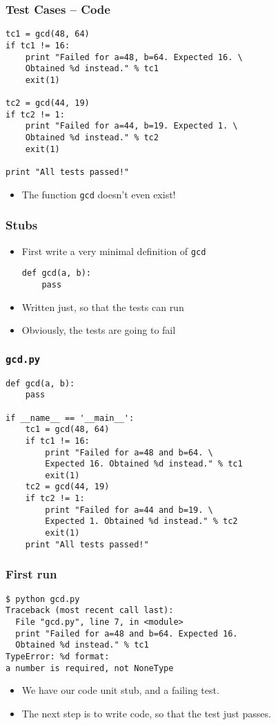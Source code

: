 \documentclass[12pt,presentation]{beamer}
\begin{document}
\begin{frame}[fragile]
  \frametitle{Test Cases -- Code}
\begin{lstlisting}
tc1 = gcd(48, 64)
if tc1 != 16:
    print "Failed for a=48, b=64. Expected 16. \
    Obtained %d instead." % tc1
    exit(1)

tc2 = gcd(44, 19)
if tc2 != 1:
    print "Failed for a=44, b=19. Expected 1. \
    Obtained %d instead." % tc2
    exit(1)

print "All tests passed!"
\end{lstlisting}
\begin{itemize}
\item The function \texttt{gcd} doesn't even exist!
\end{itemize}
\end{frame}


\begin{frame}[fragile]
  \frametitle{Stubs}
  \begin{itemize}
  \item First write a very minimal definition of \texttt{gcd}
    \begin{lstlisting}
def gcd(a, b):
    pass
    \end{lstlisting}
  \item Written just, so that the tests can run
  \item Obviously, the tests are going to fail
  \end{itemize}
\end{frame}

\begin{frame}[fragile]
  \frametitle{\texttt{gcd.py}}
\begin{lstlisting}
def gcd(a, b):
    pass

if __name__ == '__main__':
    tc1 = gcd(48, 64)
    if tc1 != 16:
        print "Failed for a=48 and b=64. \
        Expected 16. Obtained %d instead." % tc1
        exit(1)
    tc2 = gcd(44, 19)
    if tc2 != 1:
        print "Failed for a=44 and b=19. \
        Expected 1. Obtained %d instead." % tc2
        exit(1)
    print "All tests passed!"
\end{lstlisting}
\end{frame}

\begin{frame}[fragile]
  \frametitle{First run}
\begin{lstlisting}
$ python gcd.py
Traceback (most recent call last):
  File "gcd.py", line 7, in <module> 
  print "Failed for a=48 and b=64. Expected 16. 
  Obtained %d instead." % tc1
TypeError: %d format: 
a number is required, not NoneType
\end{lstlisting} %

  \begin{itemize}
  \item We have our code unit stub, and a failing test. 
  \item The next step is to write code, so that the test just passes.
  \end{itemize}
\end{frame}
\end{document}
